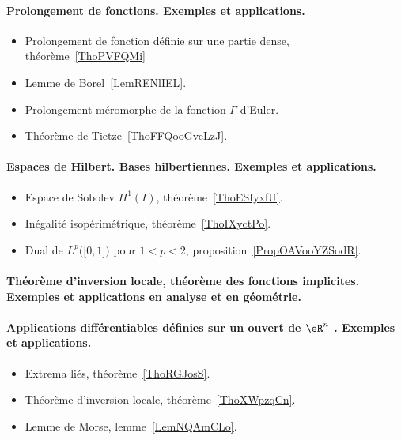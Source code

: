 \paragraph{Prolongement de fonctions. Exemples et applications.}
\begin{itemize}
    \item Prolongement de fonction définie sur une partie dense, théorème~\ref{ThoPVFQMi}
    \item Lemme de Borel~\ref{LemRENlIEL}.
    \item Prolongement méromorphe de la fonction \( \Gamma\) d'Euler.
    \item Théorème de Tietze~\ref{ThoFFQooGvcLzJ}.
\end{itemize}
\paragraph{Espaces de Hilbert. Bases hilbertiennes. Exemples et applications.}
\begin{itemize}
    \item Espace de Sobolev \( H^1(I)\), théorème~\ref{ThoESIyxfU}.
    \item Inégalité isopérimétrique, théorème~\ref{ThoIXyctPo}.
    \item Dual de \( L^p\big( \mathopen[ 0 , 1 \mathclose] \big)\) pour \( 1<p<2\), proposition~\ref{PropOAVooYZSodR}.
\end{itemize}
\paragraph{Théorème d'inversion locale, théorème des fonctions implicites. Exemples et applications en analyse et en géométrie.}
\paragraph{Applications différentiables définies sur un ouvert de $\eR^n$ . Exemples et applications.}
\begin{itemize}
    \item Extrema liés, théorème~\ref{ThoRGJosS}.
    \item Théorème d'inversion locale, théorème~\ref{ThoXWpzqCn}.
    \item Lemme de Morse, lemme~\ref{LemNQAmCLo}.
\end{itemize}
